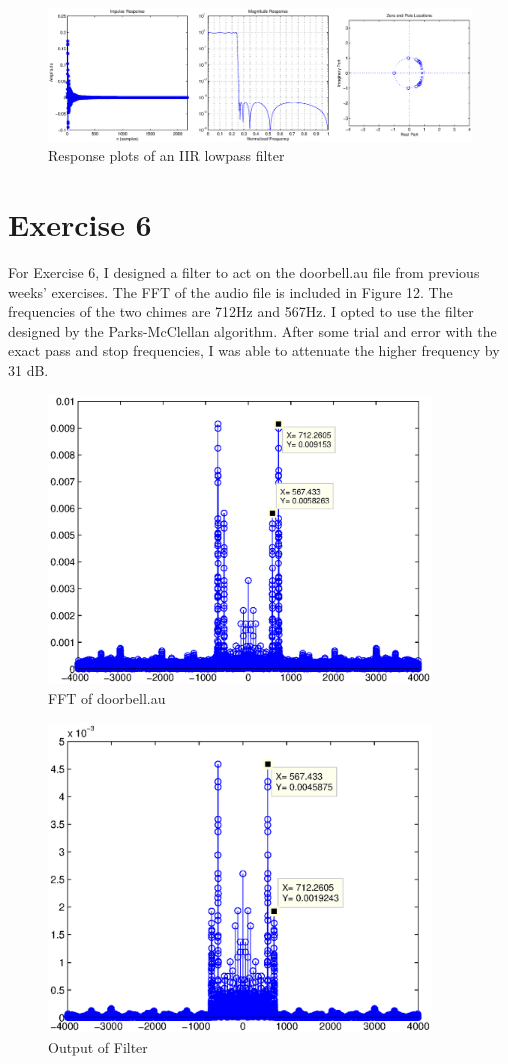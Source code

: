 \documentclass{article}
\begin{document}
\begin{figure}[htbp]
\centering
\includegraphics[width=6in]{project7_11.eps}
\caption{Response plots of an IIR lowpass filter}
\label{fig:figure11}
\end{figure}

\newpage
\section*{Exercise 6}
\begin{par}
For Exercise 6, I designed a filter to act on the doorbell.au file from previous weeks' exercises.  The FFT of the audio file is included in Figure 12.  The frequencies of the two chimes are 712Hz and 567Hz.  I opted to use the filter designed by the Parks-McClellan algorithm.  After some trial and error with the exact pass and stop frequencies, I was able to attenuate the higher frequency by 31 dB.
\end{par}

\begin{figure}[htbp]
\centering
\includegraphics[width=4in]{project6_part3.eps}
\caption{FFT of doorbell.au}
\label{fig:figure12}
\end{figure}

\begin{figure}[htbp]
\centering
\includegraphics[width=4in]{filterout.eps}
\caption{Output of Filter}
\label{fig:figure13}
\end{figure}
\end{document}
